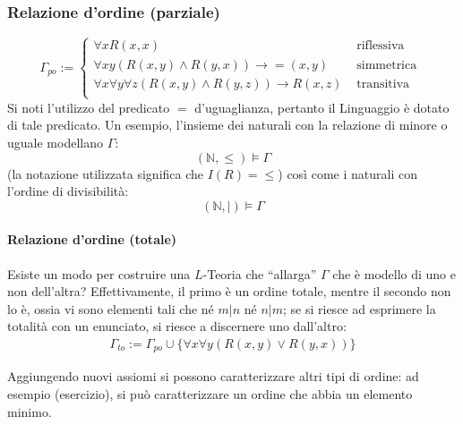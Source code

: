 \subsubsection{Relazione d'ordine (parziale)}
$$
        \Gamma_{po} := 
        \begin{cases}
                \forall x R(x,x) & \text{ riflessiva }\\
                \forall xy (R(x,y) \land R(y,x)) \rightarrow =(x,y) & \text{ simmetrica }\\
                \forall x \forall y \forall z (R(x,y) \land R(y,z)) \rightarrow R(x,z) & \text{ transitiva }\\
      
        \end{cases}
$$
Si noti l'utilizzo del predicato $=$ d'uguaglianza, pertanto il Linguaggio 
è dotato di tale predicato. 
Un esempio, l'insieme dei naturali con la relazione di minore o uguale 
modellano $\Gamma$: 
$$
(\mathbb{N}, \leq) \models \Gamma
$$
(la notazione utilizzata significa che $I(R) = \leq$)
così come i naturali con l'ordine di divisibilità: 
$$
(\mathbb{N}, |) \models \Gamma
$$


\paragraph{Relazione d'ordine (totale)}
Esiste un modo per costruire una $L$-Teoria che ``allarga'' $\Gamma$ che è modello 
di uno e non dell'altra? Effettivamente, il primo è un ordine totale, mentre 
il secondo non lo è, ossia vi sono elementi tali che né $m | n$ né $n |m $; se 
si riesce ad esprimere la totalità con un enunciato, si riesce a discernere 
uno dall'altro: 
\begin{align*}
        \Gamma_{to} := \Gamma_{po} \cup \{\forall x \forall y (R(x,y) \lor R(y,x))\}
\end{align*}

Aggiungendo nuovi assiomi si possono caratterizzare altri tipi di ordine: 
ad esempio (esercizio), si può caratterizzare un ordine che abbia un elemento 
minimo. 

